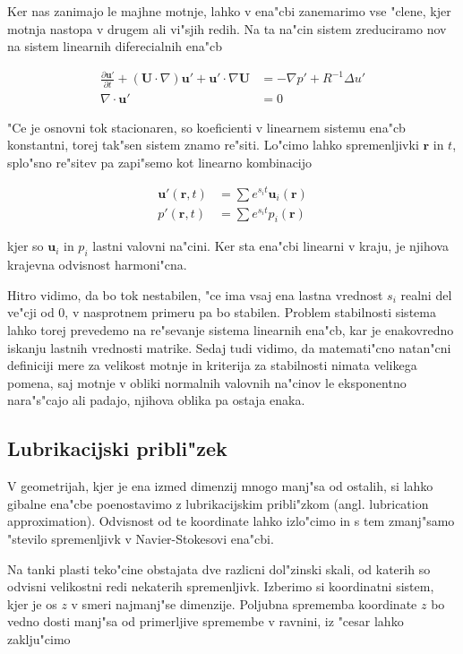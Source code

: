 \documentclass[a4paper,12pt]{article}
\renewcommand{\vec}{\mathbf}
\newcommand{\rt}{(\vec r, t)}
\begin{document}
Ker nas zanimajo le majhne motnje, lahko v ena"cbi zanemarimo vse "clene, kjer motnja nastopa v drugem ali vi"sjih redih. Na ta na"cin sistem zreduciramo nov na sistem linearnih diferecialnih ena"cb 

\begin{align}
 \label{eq:ns-linearna}
\frac{\partial \vec u'}{\partial t} + (\vec U \cdot \nabla) \vec u' + \vec u' \cdot \nabla \vec U &= -\nabla p' + R^{-1}\Delta u' \\
\label{eq:nestisljivost-linearna}
\nabla \cdot \vec u' &= 0
\end{align}

"Ce je osnovni tok stacionaren, so koeficienti v linearnem sistemu ena"cb konstantni, torej tak"sen sistem znamo re"siti. Lo"cimo lahko spremenljivki $\vec r$ in $t$, splo"sno re"sitev pa zapi"semo kot linearno kombinacijo

\begin{align}
 \vec u'\rt &= \sum e^{s_i t} \vec u_i(\vec r) \\
 p'\rt &= \sum e^{s_i t} p_i(\vec r)
\end{align}

kjer so $\vec u_i$ in $p_i$ lastni valovni na"cini. Ker sta ena"cbi linearni v kraju, je njihova krajevna odvisnost harmoni"cna. 

Hitro vidimo, da bo tok nestabilen, "ce ima vsaj ena lastna vrednost $s_i$ realni del ve"cji od 0, v nasprotnem primeru pa bo stabilen. Problem stabilnosti sistema lahko torej prevedemo na re"sevanje sistema linearnih ena"cb, kar je enakovredno iskanju lastnih vrednosti matrike. Sedaj tudi vidimo, da matemati"cno natan"cni definiciji mere za velikost motnje in kriterija za stabilnosti nimata velikega pomena, saj motnje v obliki normalnih valovnih na"cinov le eksponentno nara"s"cajo ali padajo, njihova oblika pa ostaja enaka. 

\subsection{Lubrikacijski pribli"zek}

V geometrijah, kjer je ena izmed dimenzij mnogo manj"sa od ostalih, si lahko gibalne ena"cbe poenostavimo z lubrikacijskim pribli"zkom (angl. lubrication approximation). Odvisnost od te koordinate lahko izlo"cimo in s tem zmanj"samo "stevilo spremenljivk v Navier-Stokesovi ena"cbi. 

Na tanki plasti teko"cine obstajata dve razlicni dol"zinski skali, od katerih so odvisni velikostni redi nekaterih spremenljivk. Izberimo si koordinatni sistem, kjer je os $z$ v smeri najmanj"se dimenzije. Poljubna sprememba koordinate $z$ bo vedno dosti manj"sa od primerljive spremembe v ravnini, iz "cesar lahko zaklju"cimo 
\end{document}
